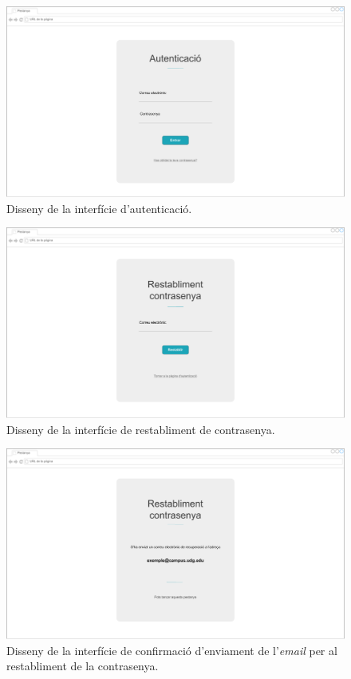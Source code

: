 \documentclass[a4paper,12pt]{ThesisStyle}
\begin{document}
\begin{figure}[H]
	\centering
	\includegraphics[width=\textwidth]{assets/interfaces/login/login.pdf}
	\caption{\label{img:login}Disseny de la interfície d'autenticació.}
\end{figure}

\begin{figure}[H]
	\centering
	\includegraphics[width=\textwidth]{assets/interfaces/login/passwordRestablishment.pdf}
	\caption{\label{img:passwordRestablishment}Disseny de la interfície de restabliment de contrasenya.}
\end{figure}

\begin{figure}[H]
	\centering
	\includegraphics[width=\textwidth]{assets/interfaces/login/passwordRestablished.pdf}
	\caption{\label{img:passwordRestablished}Disseny de la interfície de confirmació d'enviament de l'\textit{email} per al restabliment de la contrasenya.}
\end{figure}
\end{document}
